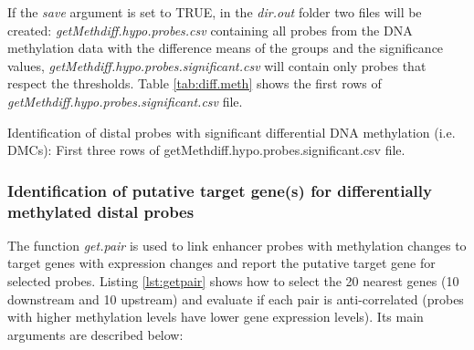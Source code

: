 

If the \textit{save} argument is set to TRUE, in the \textit{dir.out} folder two files will be created: \textit{getMethdiff.hypo.probes.csv} containing all probes from the DNA methylation data with the difference means of the groups and the significance values, \textit{getMethdiff.hypo.probes.significant.csv} will contain only probes that respect the thresholds. Table \ref{tab:diff.meth} shows the first rows of  \textit{getMethdiff.hypo.probes.significant.csv} file.

\begin{table}[h!]
\caption[Identification of distal probes with significant differential DNA methylation (i.e. DMCs)]{Identification of distal probes with significant differential DNA methylation (i.e. DMCs): First three rows of  getMethdiff.hypo.probes.significant.csv file. }
\label{tab:diff.meth}
\end{table}

\newpage
\subsubsection*{Identification of putative target gene(s) for differentially methylated distal probes}
The function \textit{get.pair} is used to link enhancer probes with methylation changes to target genes with expression changes and report the putative target gene for selected probes. Listing \ref{lst:getpair} shows how to select the 20 nearest genes (10 downstream and 10 upstream) and evaluate if each pair is anti-correlated (probes with higher methylation levels have lower gene expression levels).
Its main arguments are described below:

